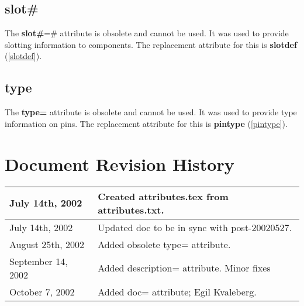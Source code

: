 \documentclass{article}
\begin{document}
\subsection{{\bf slot\#}\label{slotPOUND}}
The {\bf slot\#}=\# attribute is obsolete and cannot be used.  It was
used to provide slotting information to components.  The replacement
attribute for this is {\bf slotdef} (\ref{slotdef}).


\subsection{{\bf type}\label{type}}
The {\bf type=} attribute is obsolete and cannot be used.  It was
used to provide type information on pins. The replacement
attribute for this is {\bf pintype} (\ref{pintype}).


\newpage
\section{Document Revision History}

\begin{table}[h]
\begin{tabular}{|l|l|} \hline
July 14th, 2002 & Created attributes.tex from attributes.txt. \\ \hline
July 14th, 2002 & Updated doc to be in sync with post-20020527. \\ \hline
August 25th, 2002 & Added obsolete type= attribute. \\ \hline
September 14, 2002 & Added description= attribute. Minor fixes\\ \hline
October 7, 2002 & Added doc= attribute; Egil Kvaleberg.\\ \hline

\end{tabular}
\end{table}
\end{document}
